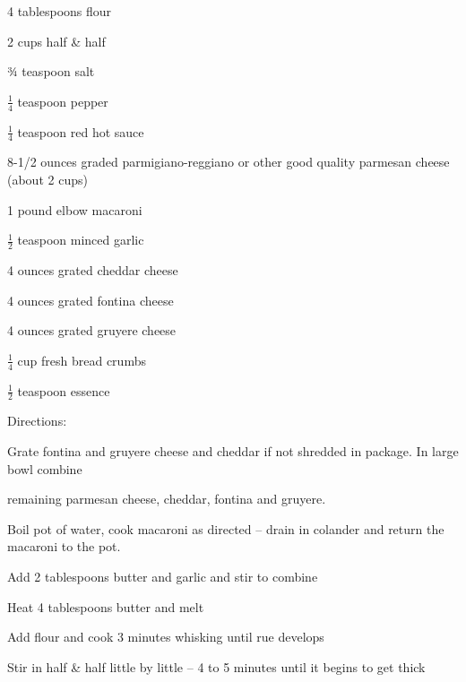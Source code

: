 \documentclass[a4paper,portrait,12pt]{book}
\begin{document}
4 tablespoons flour




2 cups half \& half




¾ teaspoon salt




$\frac{1}{4}$ teaspoon pepper




$\frac{1}{4}$ teaspoon red hot sauce




8-1/2 ounces graded parmigiano-reggiano or other good quality parmesan cheese (about 2 cups)




1 pound elbow macaroni




$\frac{1}{2}$ teaspoon minced garlic




4 ounces grated cheddar cheese




4 ounces grated fontina cheese




4 ounces grated gruyere cheese




$\frac{1}{4}$ cup fresh bread crumbs




$\frac{1}{2}$ teaspoon essence




Directions:




Grate fontina and gruyere cheese and cheddar if not shredded in package. In large bowl combine




remaining parmesan cheese, cheddar, fontina and gruyere.




Boil pot of water, cook macaroni as directed -- drain in colander and return the macaroni to the pot.




Add 2 tablespoons butter and garlic and stir to combine




Heat 4 tablespoons butter and melt




Add flour and cook 3 minutes whisking until rue develops




Stir in half \& half little by little -- 4 to 5 minutes until it begins to get thick
\end{document}
